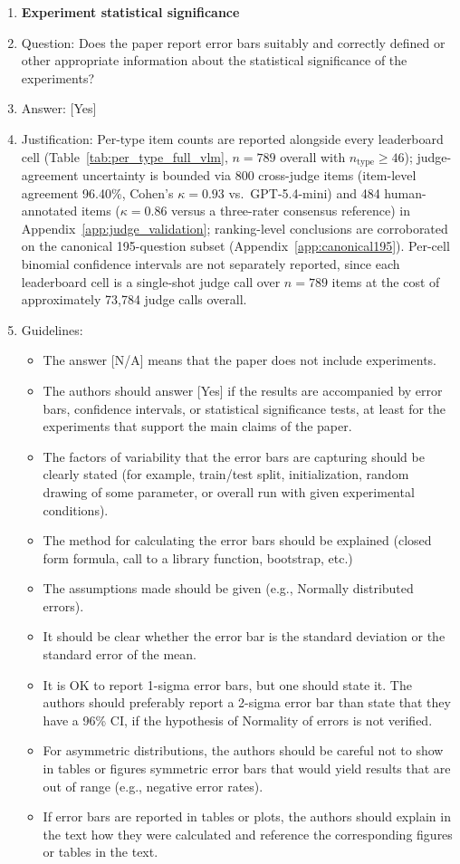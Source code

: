 \documentclass{llmxive}
\providecommand{\answerYes}[1][]{[Yes]#1}
\providecommand{\answerNA}[1][]{[N/A]#1}
\begin{document}
\begin{enumerate}
\item {\bf Experiment statistical significance}
    \item[] Question: Does the paper report error bars suitably and correctly defined or other appropriate information about the statistical significance of the experiments?
    \item[] Answer: \answerYes{}
    \item[] Justification: Per-type item counts are reported alongside every leaderboard cell (Table~\ref{tab:per_type_full_vlm}, $n=789$ overall with $n_{\text{type}} \geq 46$); judge-agreement uncertainty is bounded via 800 cross-judge items (item-level agreement 96.40\%, Cohen's $\kappa = 0.93$ vs.\ GPT-5.4-mini) and 484 human-annotated items ($\kappa = 0.86$ versus a three-rater consensus reference) in Appendix~\ref{app:judge_validation}; ranking-level conclusions are corroborated on the canonical 195-question subset (Appendix~\ref{app:canonical195}). Per-cell binomial confidence intervals are not separately reported, since each leaderboard cell is a single-shot judge call over $n=789$ items at the cost of approximately 73{,}784 judge calls overall.
    \item[] Guidelines:
    \begin{itemize}
        \item The answer \answerNA{} means that the paper does not include experiments.
        \item The authors should answer \answerYes{} if the results are accompanied by error bars, confidence intervals, or statistical significance tests, at least for the experiments that support the main claims of the paper.
        \item The factors of variability that the error bars are capturing should be clearly stated (for example, train/test split, initialization, random drawing of some parameter, or overall run with given experimental conditions).
        \item The method for calculating the error bars should be explained (closed form formula, call to a library function, bootstrap, etc.)
        \item The assumptions made should be given (e.g., Normally distributed errors).
        \item It should be clear whether the error bar is the standard deviation or the standard error of the mean.
        \item It is OK to report 1-sigma error bars, but one should state it. The authors should preferably report a 2-sigma error bar than state that they have a 96\% CI, if the hypothesis of Normality of errors is not verified.
        \item For asymmetric distributions, the authors should be careful not to show in tables or figures symmetric error bars that would yield results that are out of range (e.g., negative error rates).
        \item If error bars are reported in tables or plots, the authors should explain in the text how they were calculated and reference the corresponding figures or tables in the text.
    \end{itemize}


\end{enumerate}
\end{document}

